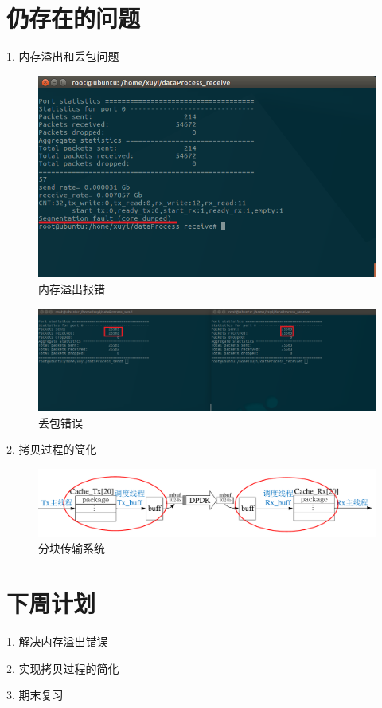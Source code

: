 \documentclass{article}
\begin{document}
\section{仍存在的问题}
1. 内存溢出和丢包问题
\begin{figure}[H]
	\centering
	\includegraphics[width = .8\textwidth]{receive_res_dumped.png}
	\caption{内存溢出报错}
\end{figure}
\begin{figure}[H]
	\centering
	\includegraphics[width = \textwidth]{err_fbp.png}
	\caption{丢包错误}
\end{figure}
2. 拷贝过程的简化
\begin{figure}[H]
	\centering
	\includegraphics[width = \textwidth]{frame_sys_copy.pdf}
	\caption{分块传输系统}
\end{figure}



\section{下周计划}
1. 解决内存溢出错误

2. 实现拷贝过程的简化

3. 期末复习
\end{document}
